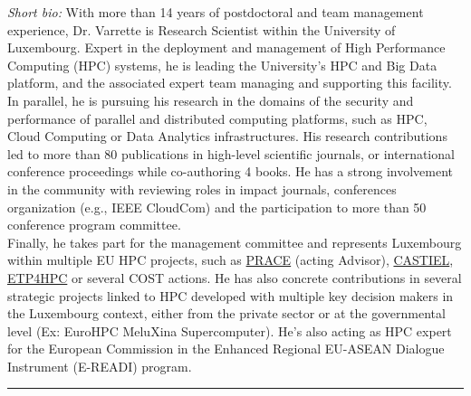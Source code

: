 \documentclass{cv}
\begin{document}
\emph{Short bio:}
With more than 14 years of postdoctoral and team management experience, Dr. Varrette is Research Scientist within the University of Luxembourg.
Expert in the deployment and management of High Performance Computing (HPC) systems, he is leading the University’s HPC and Big Data platform, and the associated expert team managing and supporting this facility.\\
In parallel, he is pursuing his research in the domains of the security and performance of parallel and distributed computing platforms, such as HPC, Cloud Computing or Data Analytics infrastructures.
His research contributions led to more than 80 publications in high-level scientific journals, or international conference proceedings while co-authoring 4 books. He has a strong involvement in the community with reviewing roles in impact journals, conferences organization (e.g., IEEE CloudCom) and the participation to more than 50 conference program committee.\\
Finally, he takes part for the management committee and represents Luxembourg within multiple EU HPC projects, such as \href{http://www.prace-ri.eu/}{PRACE} (acting Advisor), \href{https://www.castiel-project.eu/}{CASTIEL}, \href{http://www.etp4hpc.eu/}{ETP4HPC} or several COST actions. He has also concrete contributions in several strategic projects linked to HPC developed with multiple key decision makers in the Luxembourg context, either from the private sector or at the governmental level (Ex: EuroHPC MeluXina Supercomputer). He's also acting as HPC expert for the European Commission in the Enhanced Regional EU-ASEAN Dialogue Instrument (E-READI) program.


\noindent\rule{\textwidth}{0.4pt}
\end{document}
